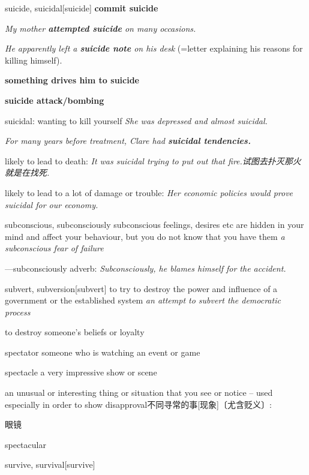 \begin{DefWord}{suicide, suicidal}[suicide]
    \textbf{commit suicide}

    \textit{My mother \textbf{attempted suicide} on many occasions.}

    \textit{He apparently left a \textbf{suicide note} on his desk} (=letter explaining his reasons for killing himself).

    \textbf{something drives him to suicide}

    \textbf{suicide attack/bombing}

    suicidal: 
    wanting to kill yourself
    \textit{She was depressed and almost suicidal.}

    \textit{For many years before treatment, Clare had \textbf{suicidal tendencies.}}

    likely to lead to death:
    \textit{It was suicidal trying to put out that fire.试图去扑灭那火就是在找死. }

    likely to lead to a lot of damage or trouble: 
    \textit{Her economic policies would prove suicidal for our economy.}
\end{DefWord}

\begin{DefWord}{subconscious, subconsciously}
    subconscious feelings, desires etc are hidden in your mind and affect your behaviour, but you do not know that you have them
    \textit{a subconscious fear of failure}

    —subconsciously adverb:
    \textit{Subconsciously, he blames himself for the accident.}
\end{DefWord}

\begin{DefWord}{subvert, subversion}[subvert]
    to try to destroy the power and influence of a government or the established system
    \textit{an attempt to subvert the democratic process}

    to destroy someone's beliefs or loyalty
\end{DefWord}

\begin{DefWord}{spectator}
    someone who is watching an event or game


\end{DefWord}

\begin{DefWord}{spectacle}
    a very impressive show or scene

    an unusual or interesting thing or situation that you see or notice – used especially in order to show disapproval不同寻常的事[现象]〔尤含贬义〕:

    眼镜
\end{DefWord}

\begin{DefWord}{spectacular}
\end{DefWord}

\begin{DefWord}{survive, survival}[survive]
\end{DefWord}
